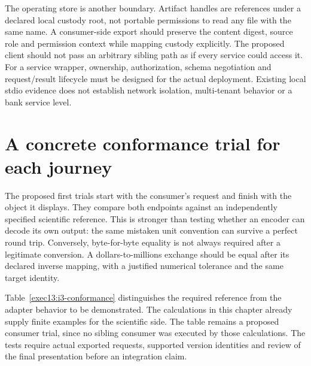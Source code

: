 The operating store is another boundary. Artifact handles are references
under a declared local custody root, not portable permissions to read any
file with the same name. A consumer-side export should preserve the content
digest, source role and permission context while mapping custody explicitly.
The proposed client should not pass an arbitrary sibling path as if every
service could access it. For a service wrapper, ownership, authorization,
schema negotiation and request/result lifecycle must be designed for the
actual deployment. Existing local stdio evidence does not establish network
isolation, multi-tenant behavior or a bank service level.

\section{A concrete conformance trial for each journey}

The proposed first trials start with the consumer's request and finish with
the object it displays. They compare both endpoints against an independently
specified scientific reference. This is stronger than testing whether an
encoder can decode its own output: the same mistaken unit convention can
survive a perfect round trip. Conversely, byte-for-byte equality is not always
required after a legitimate conversion. A dollars-to-millions exchange should
be equal after its declared inverse mapping, with a justified numerical
tolerance and the same target identity.

Table~\ref{exec13:i3-conformance} distinguishes the required reference from
the adapter behavior to be demonstrated. The calculations in this chapter
already supply finite examples for the scientific side. The table remains a
proposed consumer trial, since no sibling consumer was executed by those
calculations. The tests require actual exported requests, supported version
identities and review of the final presentation before an integration claim.

